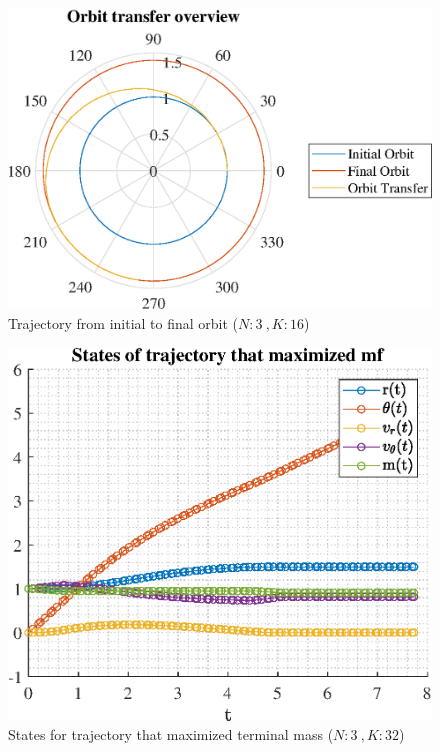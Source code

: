 \documentclass[]{article}
\begin{document}
	\begin{figure}
		\centering
		\includegraphics[scale=0.75]{orbit_N3_K16_C2_mf.eps}
		\caption{Trajectory from initial to final orbit (\(N:3\ , K:16\))}
		\label{fig:orbit_N3_K16_C2_mf}
	\end{figure}
	\begin{figure}
		\centering
		\includegraphics[scale=0.75]{states_N3_K32_C2_mf.eps}
		\caption{States for trajectory that maximized terminal mass (\(N:3\ , K:32\))}
		\label{fig:states_N3_K32_C2_mf}
	\end{figure}
\end{document}
